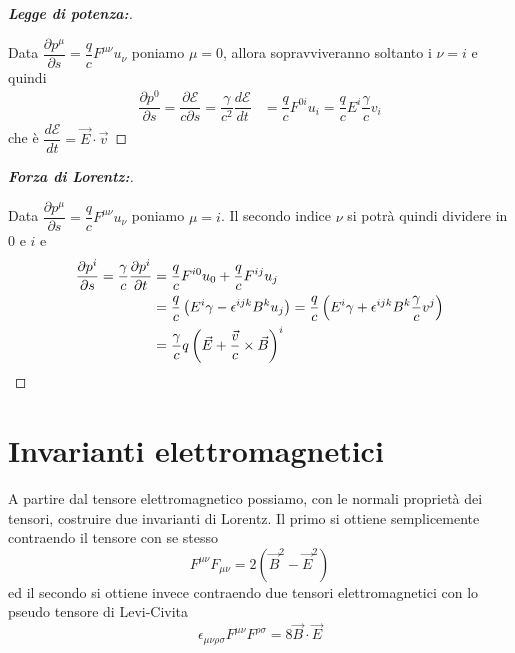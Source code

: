 \documentclass[12pt,a4paper,titlepage, twoside, openright]{book}
\newenvironment{proofT}[1][\proofname]{  %
  \begin{proof}[\bfseries #1:]$ $\par\nobreak\ignorespaces\noindent
  }{
  \end{proof}
}
\numberwithin{equation}{chapter}
\begin{document}
\begin{proofT}[Legge di potenza]
Data $\dfrac{\partial p^\mu}{\partial s}= \dfrac{q}{c} F^{\mu\nu} u_\nu$ poniamo $\mu=0$, allora sopravviveranno soltanto i $\nu=i$ e quindi
\begin{align*}
\dfrac{\partial p^0}{\partial s}=\dfrac{\partial\mathcal{E}}{c\partial s}=\dfrac{\gamma}{c^2}\dfrac{d\mathcal{E}}{dt} &=\dfrac{q}{c}F^{0i}u_i=\dfrac{q}{c}E^i \dfrac{\gamma}{c}v_i
\end{align*}
che è $\dfrac{d\mathcal{E}}{dt}=\vec{E}\cdot\vec{v}$\qedhere
\end{proofT}

\begin{proofT}[Forza di Lorentz]
Data $\dfrac{\partial p^\mu}{\partial s}= \dfrac{q}{c} F^{\mu\nu} u_\nu$ poniamo $\mu=i$. Il secondo indice $\nu$ si potrà quindi dividere in $0$ e $i$ e 
\begin{align*}
\dfrac{\partial p^i}{\partial s}=\dfrac{\gamma}{c}\dfrac{\partial p^i}{\partial t}&=\dfrac{q}{c}F^{i0}u_0+\dfrac{q}{c}F^{ij}u_j \\ 
& = \dfrac{q}{c}\left( E^i\gamma-\epsilon^{ijk}B^k u_j \right) 
 = \dfrac{q}{c}\left( E^i\gamma+\epsilon^{ijk}B^k\dfrac{\gamma}{c} v^j \right) \\
& =\dfrac{\gamma}{c}q\left( \vec{E} + \dfrac{\vec{v}}{c}\times\vec{B} \right)^i \qedhere
\end{align*}

\end{proofT}

\section{Invarianti elettromagnetici}
A partire dal tensore elettromagnetico possiamo, con le normali proprietà dei tensori, costruire due invarianti di Lorentz. Il primo si ottiene semplicemente contraendo il tensore con se stesso
\begin{equation}
F^{\mu\nu}F_{\mu\nu}=2(\vec{B}^2-\vec{E}^2)
\end{equation}
ed il secondo si ottiene invece contraendo due tensori elettromagnetici con lo pseudo tensore di Levi-Civita
\begin{equation}
\epsilon_{\mu\nu\rho\sigma}F^{\mu\nu}F^{\rho\sigma}=8\vec{B}\cdot \vec{E}
\end{equation}
\end{document}
